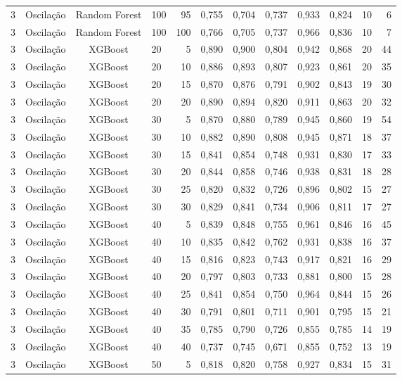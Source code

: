 \begin{longtable}{ccclrrrrrrrr}
3 & Oscilação & Random Forest & 100 & 95 & 0,755 & 0,704 & 0,737 & 0,933 & 0,824 & 10 & 6 \\
3 & Oscilação & Random Forest & 100 & 100 & 0,766 & 0,705 & 0,737 & 0,966 & 0,836 & 10 & 7 \\
3 & Oscilação & XGBoost & 20 & 5 & 0,890 & 0,900 & 0,804 & 0,942 & 0,868 & 20 & 44 \\
3 & Oscilação & XGBoost & 20 & 10 & 0,886 & 0,893 & 0,807 & 0,923 & 0,861 & 20 & 35 \\
3 & Oscilação & XGBoost & 20 & 15 & 0,870 & 0,876 & 0,791 & 0,902 & 0,843 & 19 & 30 \\
3 & Oscilação & XGBoost & 20 & 20 & 0,890 & 0,894 & 0,820 & 0,911 & 0,863 & 20 & 32 \\
3 & Oscilação & XGBoost & 30 & 5 & 0,870 & 0,880 & 0,789 & 0,945 & 0,860 & 19 & 54 \\
3 & Oscilação & XGBoost & 30 & 10 & 0,882 & 0,890 & 0,808 & 0,945 & 0,871 & 18 & 37 \\
3 & Oscilação & XGBoost & 30 & 15 & 0,841 & 0,854 & 0,748 & 0,931 & 0,830 & 17 & 33 \\
3 & Oscilação & XGBoost & 30 & 20 & 0,844 & 0,858 & 0,746 & 0,938 & 0,831 & 18 & 28 \\
3 & Oscilação & XGBoost & 30 & 25 & 0,820 & 0,832 & 0,726 & 0,896 & 0,802 & 15 & 27 \\
3 & Oscilação & XGBoost & 30 & 30 & 0,829 & 0,841 & 0,734 & 0,906 & 0,811 & 17 & 27 \\
3 & Oscilação & XGBoost & 40 & 5 & 0,839 & 0,848 & 0,755 & 0,961 & 0,846 & 16 & 45 \\
3 & Oscilação & XGBoost & 40 & 10 & 0,835 & 0,842 & 0,762 & 0,931 & 0,838 & 16 & 37 \\
3 & Oscilação & XGBoost & 40 & 15 & 0,816 & 0,823 & 0,743 & 0,917 & 0,821 & 16 & 29 \\
3 & Oscilação & XGBoost & 40 & 20 & 0,797 & 0,803 & 0,733 & 0,881 & 0,800 & 15 & 28 \\
3 & Oscilação & XGBoost & 40 & 25 & 0,841 & 0,854 & 0,750 & 0,964 & 0,844 & 15 & 26 \\
3 & Oscilação & XGBoost & 40 & 30 & 0,791 & 0,801 & 0,711 & 0,901 & 0,795 & 15 & 21 \\
3 & Oscilação & XGBoost & 40 & 35 & 0,785 & 0,790 & 0,726 & 0,855 & 0,785 & 14 & 19 \\
3 & Oscilação & XGBoost & 40 & 40 & 0,737 & 0,745 & 0,671 & 0,855 & 0,752 & 13 & 19 \\
3 & Oscilação & XGBoost & 50 & 5 & 0,818 & 0,820 & 0,758 & 0,927 & 0,834 & 15 & 31 \\

\end{longtable}
